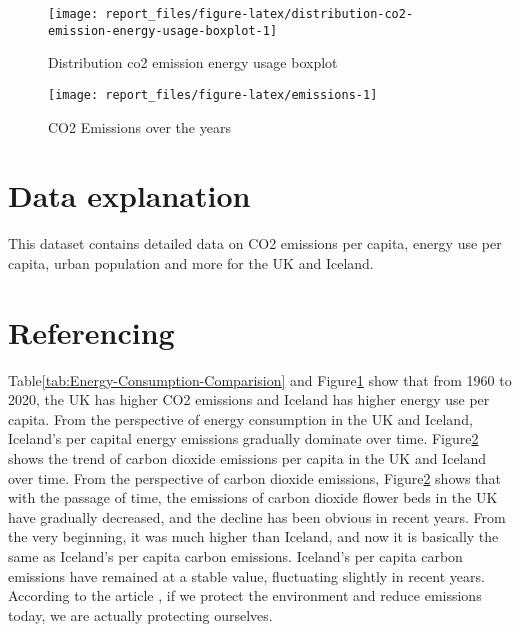 \documentclass[11pt,a4paper,]{article}
\begin{document}
\begin{figure}[H]

{\centering \texttt{[image: report\_files/figure-latex/distribution-co2-emission-energy-usage-boxplot-1]} 

}

\caption{Distribution co2 emission energy usage boxplot}\label{fig:distribution-co2-emission-energy-usage-boxplot}
\end{figure}

\begin{figure}[H]

{\centering \texttt{[image: report\_files/figure-latex/emissions-1]} 

}

\caption{CO2 Emissions over the years}\label{fig:emissions}
\end{figure}

\hypertarget{data-explanation-3}{%
\section{Data explanation}\label{data-explanation-3}}

This dataset contains detailed data on CO2 emissions per capita, energy use per capita, urban population and more for the UK and Iceland.

\hypertarget{referencing-3}{%
\section{Referencing}\label{referencing-3}}

Table\ref{tab:Energy-Consumption-Comparision} and Figure\ref{fig:distribution-co2-emission-energy-usage-boxplot} show that from 1960 to 2020, the UK has higher CO2 emissions and Iceland has higher energy use per capita. From the perspective of energy consumption in the UK and Iceland, Iceland's per capital energy emissions gradually dominate over time. Figure\ref{fig:emissions} shows the trend of carbon dioxide emissions per capita in the UK and Iceland over time. From the perspective of carbon dioxide emissions, Figure\ref{fig:emissions} shows that with the passage of time, the emissions of carbon dioxide flower beds in the UK have gradually decreased, and the decline has been obvious in recent years. From the very beginning, it was much higher than Iceland, and now it is basically the same as Iceland's per capita carbon emissions. Iceland's per capita carbon emissions have remained at a stable value, fluctuating slightly in recent years. According to the article \textcite{2019Determinants}, if we protect the environment and reduce emissions today, we are actually protecting ourselves.
\end{document}
